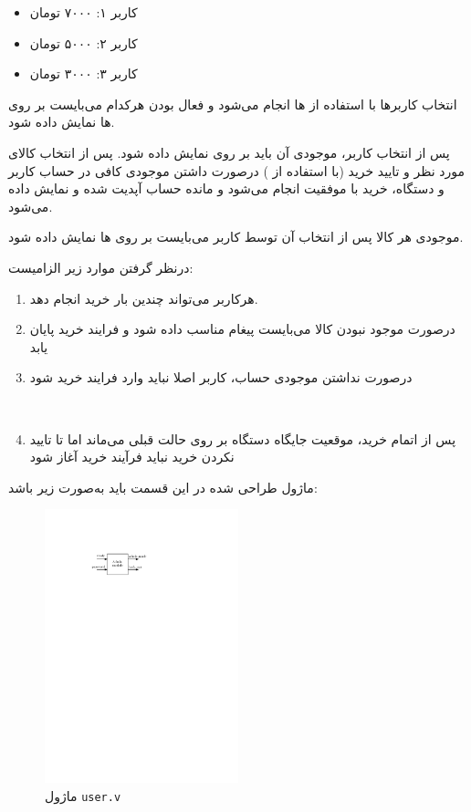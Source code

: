 \documentclass[]{article}
\begin{document}
\begin{itemize}
	\item کاربر ۱: ۷۰۰۰ تومان
	\item کاربر ۲: ۵۰۰۰ تومان
	\item کاربر ۳: ۳۰۰۰ تومان 
\end{itemize}

انتخاب کاربر‌ها با استفاده از  ها انجام می‌شود و فعال بودن هرکدام می‌بایست بر روی  ها نمایش داده شود.

پس از انتخاب کاربر، موجودی آن باید بر روی  نمایش داده شود. پس از انتخاب کالای مورد نظر و تایید خرید (با استفاده از ) درصورت داشتن موجودی کافی در حساب کاربر و دستگاه، خرید با موفقیت انجام می‌شود و مانده حساب آپدیت شده و نمایش داده می‌شود.

موجودی هر کالا پس از انتخاب آن توسط کاربر می‌بایست بر روی  ها نمایش داده شود.

درنظر گرفتن موارد زیر الزامیست:

\begin{enumerate}
	\item هرکاربر می‌تواند چندین بار خرید انجام دهد.
	\item درصورت موجود نبودن کالا می‌بایست پیغام مناسب داده شود و فرایند خرید پایان یابد
	\item درصورت نداشتن موجودی حساب، کاربر اصلا نباید وارد فرایند خرید شود
	
	\newpage
	\Large \textbf{\\
	}
	
	\item پس از اتمام خرید، موقعیت جایگاه دستگاه بر روی حالت قبلی می‌ماند اما تا تایید نکردن خرید نباید فرآیند خرید آغاز شود
\end{enumerate}



ماژول طراحی شده در این قسمت باید به‌صورت زیر باشد:

\begin{figure}[h]
	\centering
	\includegraphics[width=0.5\textwidth]{images/admin.pdf}
	\caption{ماژول \texttt{user.v}}
	\label{ماژول user.v}
\end{figure}
\end{document}
